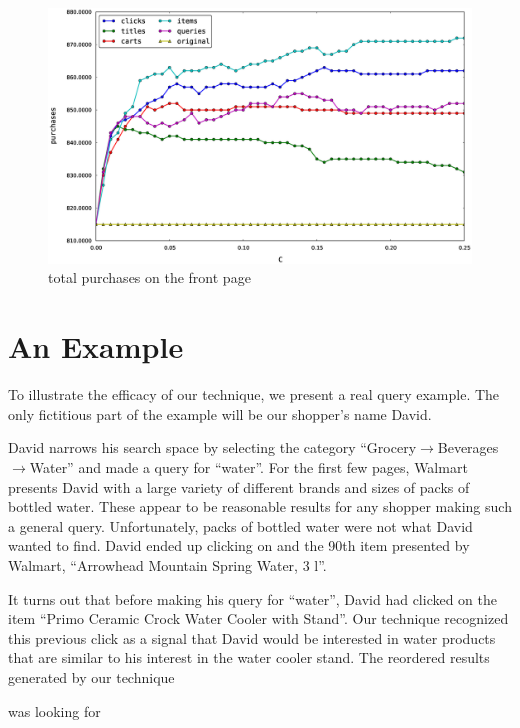 \documentclass{article}
\begin{document}
\begin{figure}[htbp!]
\centering
\includegraphics[width=\textwidth]{000050_0.48chunk.k100.i2.n100.total_purchased_front_page.0-0.25.eps}
\caption{total purchases on the front page}
\label{fig:total_purchases_on_the_front_page}
\end{figure}

\section{An Example}

To illustrate the efficacy of our technique, we present a real query example.
The only fictitious part of the example will be our shopper's name David.

David narrows his search space by selecting the category
``Grocery$\rightarrow$Beverages$\rightarrow$Water'' and made a query for
``water''. For the first few pages, Walmart presents David with a large
variety of different brands and sizes of packs of bottled water. These appear to
be reasonable results for any shopper making such a general query.
Unfortunately, packs of bottled water were not what David wanted to find. David
ended up clicking on and the 90th item presented by Walmart, ``Arrowhead
Mountain Spring Water, 3 l''. %

It turns out that before making his query for ``water'', David had clicked on
the item ``Primo Ceramic Crock Water Cooler with Stand''. %
Our technique recognized this previous click as a signal that David would be
interested in water products that are similar to his interest in the water
cooler stand. The reordered results generated by our technique 

was looking for 
\end{document}
